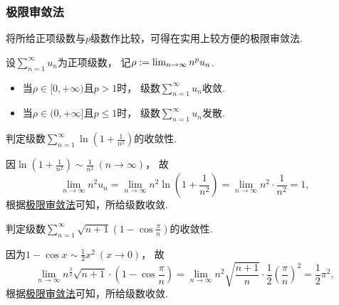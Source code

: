 

\subsubsection{极限审敛法}
将所给正项级数与\(p\)级数作比较，可得在实用上较方便的极限审敛法.
\begin{theorem}[极限审敛法]\label{theorem:无穷级数.正项级数的极限审敛法}
设\(\sum_{n=1}^\infty u_n\)为正项级数，
记\(\rho := \lim_{n\to\infty} n^p u_n\).
\begin{itemize}
	\item 当\(\rho\in[0,+\infty)\)且\(p>1\)时，
	级数\(\sum_{n=1}^\infty u_n\)收敛.

	\item 当\(\rho\in(0,+\infty]\)且\(p\leq1\)时，
	级数\(\sum_{n=1}^\infty u_n\)发散.
\end{itemize}
\end{theorem}

\begin{example}
判定级数\(\sum_{n=1}^\infty \ln(1+\frac{1}{n^2})\)的收敛性.
\begin{solution}
因\(\ln(1+\frac{1}{n^2}) \sim \frac{1}{n^2}\ (n\to\infty)\)，
故\[
	\lim_{n\to\infty} n^2 u_n
	= \lim_{n\to\infty} n^2 \ln(1+\frac{1}{n^2})
	= \lim_{n\to\infty} n^2 \cdot \frac{1}{n^2}
	= 1,
\]
根据\hyperref[theorem:无穷级数.正项级数的极限审敛法]{极限审敛法}可知，所给级数收敛.
\end{solution}
\end{example}

\begin{example}
判定级数\(\sum_{n=1}^\infty \sqrt{n+1} \left(1-\cos\frac{\pi}{n}\right)\)的收敛性.
\begin{solution}
因为\(1 - \cos x \sim \frac{1}{2} x^2\ (x\to0)\)，
故\[
	\lim_{n\to\infty} n^{\frac32} \sqrt{n+1} \cdot \left(1-\cos\frac{\pi}{n}\right)
	= \lim_{n\to\infty} n^2 \sqrt{\frac{n+1}{n}} \cdot \frac{1}{2} \left(\frac{\pi}{n}\right)^2
	= \frac{1}{2} \pi^2,
\]
根据\hyperref[theorem:无穷级数.正项级数的极限审敛法]{极限审敛法}可知，所给级数收敛.
\end{solution}
\end{example}

